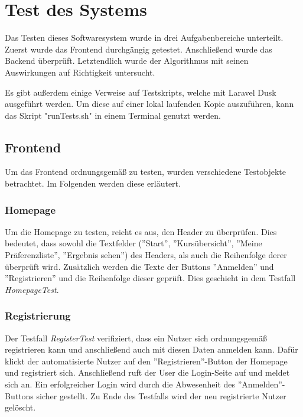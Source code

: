 \chapter{Test des Systems}
\label{chapter:testing}

	Das Testen dieses Softwaresystem wurde in drei Aufgabenbereiche unterteilt.
	Zuerst wurde das Frontend durchgängig getestet.
	Anschließend wurde das Backend überprüft.
	Letztendlich wurde der Algorithmus mit seinen Auswirkungen auf Richtigkeit untersucht.\newline
	
	Es gibt außerdem einige Verweise auf Testskripts, welche mit Laravel Dusk ausgeführt werden.
	Um diese auf einer lokal laufenden Kopie auszuführen, kann das Skript "runTests.sh" in einem Terminal genutzt werden.
	
	\section{Frontend}
		Um das Frontend ordnungsgemäß zu testen, wurden verschiedene Testobjekte betrachtet.
		Im Folgenden werden diese erläutert.
		
		\subsection{Homepage}
			Um die Homepage zu testen, reicht es aus, den Header zu überprüfen.
			Dies bedeutet, dass sowohl die Textfelder (''Start'', ''Kursübersicht'', ''Meine Präferenzliste'', ''Ergebnis sehen'') des Headers, als auch die Reihenfolge derer überprüft wird.
			Zusätzlich werden die Texte der Buttons ''Anmelden'' und ''Registrieren'' und die Reihenfolge dieser geprüft.
			Dies geschieht in dem Testfall \textit{HomepageTest}.\newline
		
		\subsection{Registrierung}
			Der Testfall \textit{RegisterTest} verifiziert, dass ein Nutzer sich ordnungsgemäß registrieren kann und anschließend auch mit diesen Daten anmelden kann.
			Dafür klickt der automatisierte Nutzer auf den ''Registrieren''-Button der Homepage und registriert sich.
			Anschließend ruft der User die Login-Seite auf und meldet sich an.
			Ein erfolgreicher Login wird durch die Abwesenheit des ''Anmelden''-Buttons sicher gestellt.
			Zu Ende des Testfalls wird der neu registrierte Nutzer gelöscht.\newline
		

